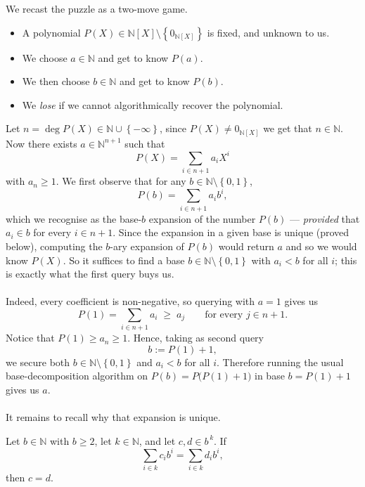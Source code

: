 \begin{solution}
    We recast the puzzle as a two-move game.
    \begin{itemize}
        \item A polynomial \( P\left(X\right)\in\mathbb{N}\left[X\right]\setminus\left\{0_{\mathbb{N}\left[X\right]}\right\} \) is fixed, and unknown to us.
        \item We choose \( a\in\mathbb{N} \) and get to know \( P\left(a\right) \).
        \item We then choose \( b\in\mathbb{N} \) and get to know \( P\left(b\right) \).
        \item We \emph{lose} if we cannot algorithmically recover the polynomial.
    \end{itemize}
    Let \( n=\deg P\left(X\right)\in \mathbb{N}\cup\left\{-\infty\right\} \), since \( P\left(X\right)\neq 0_{\mathbb{N}\left[X\right]} \) we get that \( n\in\mathbb{N} \). Now there exists \( a\in\mathbb{N}^{n+1} \) such that
    \[
        P\left(X\right)=\sum_{i\in n+1}a_iX^i
    \]
    with \( a_n \geq 1 \). We first observe that for any \( b\in\mathbb{N}\setminus\left\{0,1\right\} \),
    \[
        P\left(b\right)=\sum_{i\in n+1}a_i b^i,
    \]
    which we recognise as the base-\( b \) expansion of the number \( P\left(b\right) \) --- \emph{provided} that \( a_i\in b \) for every \( i\in n+1 \). Since the expansion in a given base is unique (proved below), computing the \( b \)-ary expansion of \( P\left(b\right) \) would return \( a \) and so we would know \( P\left(X\right) \). So it suffices to find a base \( b\in\mathbb{N}\setminus\left\{0,1\right\} \) with \( a_i<b \) for all \( i \); this is exactly what the first query buys us.
    \\\\
    Indeed, every coefficient is non-negative, so querying with \( a=1 \) gives us
    \[
        P\left(1\right)=\sum_{i\in n+1}a_i\;\ge\;a_j\qquad\text{for every }j\in n+1 .
    \]
    Notice that \( P\left(1\right)\geq a_n\geq 1 \). Hence, taking as second query
    \[
        b:=P\left(1\right)+1,
    \]
    we secure both \( b\in\mathbb{N}\setminus\left\{0,1\right\} \) and \( a_i<b \) for all \( i \). Therefore running the usual base-decomposition algorithm on \( P\left(b\right)=P\bigl(P\left(1\right)+1\bigr) \) in base \( b= P\left(1\right)+1 \) gives us \( a \).
    \\\\
    It remains to recall why that expansion is unique.
    \begin{lemma}
        Let \( b\in\mathbb{N} \) with \( b\ge 2 \), let \( k\in\mathbb{N} \), and let \( c,d\in b^{\,k} \). If
        \[
            \sum_{i\in k}c_i b^i=\sum_{i\in k}d_i b^i,
        \]
        then \( c=d \).
    \end{lemma}


\end{solution}
